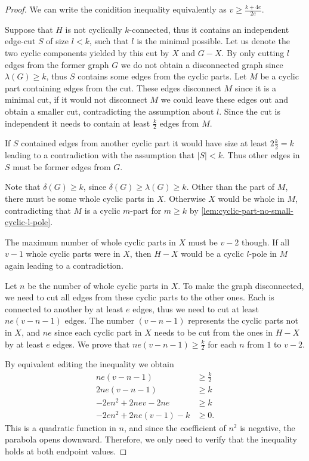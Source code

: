\documentclass[12pt, twoside]{book}
\begin{document}
\begin{proof}
	We can write the conidition inequality equivalently as $v\geq \frac{k+4e}{2e}$.
	
	Suppose that $H$ is not cyclically $k$-connected, thus it contains an independent \mbox{edge-cut} $S$ of size $l<k$, such that $l$ is the minimal possible. Let us denote the two cyclic components yielded by this cut by $X$ and $G-X$. By only cutting $l$ edges from the former graph $G$ we do not obtain a disconnected graph since $\lambda(G)\geq k$, thus $S$ contains some edges from the cyclic parts. Let $M$ be a cyclic part containing edges from the cut. These edges disconnect $M$ since it is a minimal cut, if it would not disconnect $M$ we could leave these edges out and obtain a smaller cut, contradicting the assumption about $l$. Since the cut is independent it needs to contain at least $\frac{k}{2}$ edges from $M$.
	
	If $S$ contained edges from another cyclic part it would have size at least $2\frac{k}{2}=k$ leading to a contradiction with the assumption that $|S|<k$. Thus other edges in $S$ must be former edges from $G$.
	
	Note that $\delta(G)\geq k$, since $\delta(G)\geq \lambda(G)\geq k$. Other than the part of $M$, there must be some whole cyclic parts in $X$. Otherwise $X$ would be whole in $M$, contradicting that $M$ is a cyclic $m$-part for $m\geq k$ by \cref{lem:cyclic-part-no-small-cyclic-l-pole}.
	
	The maximum number of whole cyclic parts in $X$ must be $v-2$ though. If all $v-1$ whole cyclic parts were in $X$, then $H-X$ would be a cyclic $l$-pole in $M$ again leading to a contradiction.
	
	Let $n$ be the number of whole cyclic parts in $X$. To make the graph disconnected, we need to cut all edges from these cyclic parts to the other ones. Each is connected to another by at least $e$ edges, thus we need to cut at least $ne(v-n-1)$ edges. The number $(v-n-1)$ represents the cyclic parts not in $X$, and $ne$ since each cyclic part in $X$ needs to be cut from the ones in $H-X$ by at least $e$ edges. We prove that $ne(v-n-1)\geq\frac{k}{2}$ for each $n$ from $1$ to $v-2$.
	
	By equivalent editing the inequality we obtain
	\begin{align*}
		ne(v-n-1)&\geq\frac{k}{2} \\
		2ne(v-n-1)&\geq k \\
		-2en^2+2nev-2ne&\geq k \\
		-2en^2+2ne(v-1)-k&\geq 0.
	\end{align*}
	This is a quadratic function in $n$, and since the coefficient of $n^2$ is negative, the parabola opens downward. Therefore, we only need to verify that the inequality holds at both endpoint values.
	

\end{proof}
\end{document}

